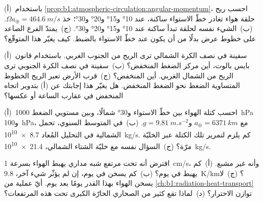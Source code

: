 \begin{exercise}[$\star\star$]\label{exo:b1:atmospheric-circulation:6}
(أ)~باستخدام \cref{prop:b1:atmospheric-circulation:angular-momentum}، احسب ريح حلقة هواء تغادر خطّ الاستواء ساكنة، عند \ang{10} و\ang{15} و\ang{20} و\ang{30}؛ خذ $\Omega a_\oplus = \qty{464.6}{m/s}$. (ب)~الشيء نفسه لحلقة تبدأ ساكنة عند \ang{10} و\ang{15} و\ang{20} و\ang{30}. (ج)~يمتدّ الفرع الصاعد  على خطوط عرض بدلًا من أن يكون عند خطّ الاستواء بالضبط. كيف يغيّر هذا  المتوقّع؟
\end{exercise}

\begin{exercise}[$\star\star$]\label{exo:b1:atmospheric-circulation:7}
(أ)~سفينة في نصف الكرة الشمالي ترى الريح من الجنوب الغربي. باستخدام قانون بايس بالوت، أين مركز الضغط المنخفض؟ (ب)~سفينة في نصف الكرة الجنوبي ترى الريح من الشمال الغربي. أين المنخفض؟ (ج)~قرب الأرض تعبر الريح الخطوط المتساوية الضغط نحو الضغط المنخفض. هل يغيّر هذا إجابتك عن (أ) بتدوير اتجاه المنخفض في عقارب الساعة أو عكسها؟
\end{exercise}

\begin{exercise}[$\star\star$]\label{exo:b1:atmospheric-circulation:8}
(أ)~احسب كتلة الهواء بين خطّ الاستواء و\ang{30} شمالًا، وبين مستويي الضغط \qty{1000}{hPa} و\qty{100}{hPa}، مع $a_\oplus = \qty{6371}{km}$
و$g = \qty{9.81}{m.s^{-2}}$. (ب)~في المتوسط السنوي، تحمل  الشمالية في التحليل المُعاد \qty{8.7e10}{kg/s}. كم يلزم لتمرير تلك الكتلة عبر الخليّة مرّة؟ (ج)~السؤال نفسه مع خليّة الشتاء الشمالي، \qty{21.4e10}{kg/s}.
\end{exercise}

\begin{exercise}[$\star\star$]\label{exo:b1:atmospheric-circulation:9}
افترض أنه تحت مرتفع شبه مداري يهبط الهواء بسرعة \qty{1}{cm/s}، وأنه غير مشبع. (أ)~كم يهبط في يوم؟ (ب)~كم يسخن في يوم، إن لم يؤثّر شيء آخر،  \qty{9.8}{K/km}؟ (ج)~لا يسخن الهواء بهذا القدر يومًا بعد يوم. أيّ عملية من \cref{ch:b1:radiation-heat-transport} توازن الاحترار؟ (د)~لماذا تقع كثير من الصحاري الحارّة الكبرى تحت هذه المرتفعات؟
\end{exercise}

